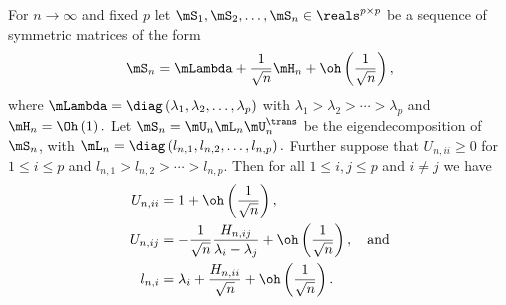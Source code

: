 \begin{lemma}\label{L:eigen-perturb}
For 
\(
    n \to \infty
\)
and fixed
\(
    p
\)
let
\(
    \mS_1, \mS_2, \ldots, \mS_n \in \reals^{p\times p}
\) 
be a sequence of symmetric matrices of the form
\[
    \mS_n 
    = 
    \mLambda
    +
    \frac{1}{\sqrt{n}}
    \mH_n
    +
    \oh\left( \frac{1}{\sqrt{n}} \right),
\]
where
\(
    \mLambda
    =
    \diag \left(
        \lambda_1,
        \lambda_2,
        \ldots,
        \lambda_p
    \right)
\)
with 
\(
    \lambda_1 > \lambda_2 > \cdots > \lambda_p
\) 
and
\(
    \mH_n = \Oh\left( 1 \right).
\)
Let $\mS_n = \mU_n \mL_n \mU_n^\trans$ be the eigendecomposition of $\mS_n$, with
\(
    \mL_n
    =
    \diag \left(
        l_{n,1}, l_{n,2}, \ldots, l_{n,p}
    \right).
\)
Further suppose that $U_{n,ii} \geq 0$ for $1 \leq i \leq p$ and
\(
    l_{n,1} > l_{n,2} > \cdots > l_{n,p}.
\)
Then for all $1 \leq i,j \leq p$ and $i \neq j$ we have
\begin{subequations}
\begin{align}
    U_{n,ii} 
        &= 1 
           + 
           \oh \left( 
               \frac{ 1 }{ \sqrt{n} }
           \right), \\
    U_{n,ij}
        &= -
           \frac{ 1 }{ \sqrt{n} }
           \frac{ H_{n,ij} }{ \lambda_i - \lambda_j }
           +
           \oh \left(
               \frac{ 1 }{ \sqrt{n} }
           \right), \quad \text{and} \\
    l_{n,i}
        &= \lambda_i
           + 
           \frac{ H_{n,ii} }{ \sqrt{n} }
           +
           \oh \left(
               \frac{ 1 }{ \sqrt{n} }
           \right).
\end{align}
\end{subequations}
\end{lemma}

